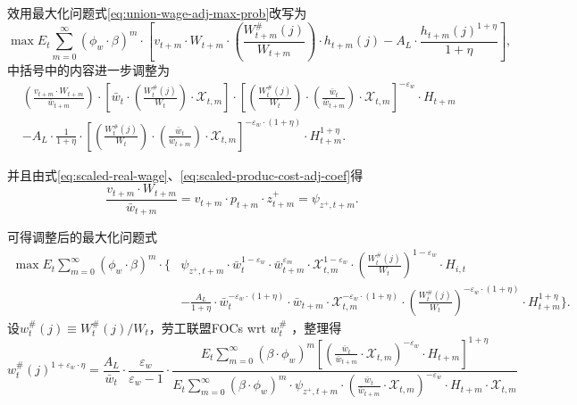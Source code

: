 效用最大化问题式\eqref{eq:union-wage-adj-max-prob}改写为
\begin{equation*}
  \max E_t \sum_{m=0}^{\infty} \left(\phi_w \cdot \beta \right)^{m}  \cdot \left[v_{t+m} \cdot W_{t+m} \cdot \left(\frac{W_{t+m}^{\#}(j)}{W_{t+m}}\right) \cdot h_{t+m}(j) - A_L \cdot \frac{h_{t+m}(j)^{1+\eta}}{1+\eta}\right] ,
\end{equation*}
中括号中的内容进一步调整为
\begin{align*}
&\left(\frac{v_{t+m} \cdot W_{t+m}}{\bar{w}_{t+m}}\right) \cdot \left[\bar{w}_t \cdot \left(\frac{W_t^{\#}(j)}{W_{t}}\right) \cdot \mathcal{X}_{t,m}\right] \cdot \left[ \left(\frac{W_t^{\#}(j)}{W_t}\right) \cdot \left(\frac{\bar{w}_t}{\bar{w}_{t+m}}\right) \cdot \mathcal{X}_{t,m} \right]^{-\varepsilon_w} \cdot H_{t+m} \\
&- A_L \cdot \frac{1}{1+\eta}  \cdot \left[ \left(\frac{W_t^{\#}(j)}{W_t}\right) \cdot \left(\frac{\bar{w}_t}{\bar{w}_{t+m}}\right) \cdot \mathcal{X}_{t,m} \right]^{-\varepsilon_w \cdot (1+\eta)} \cdot H_{t+m}^{1+\eta}.
\end{align*}

并且由式\eqref{eq:scaled-real-wage}、\eqref{eq:scaled-produc-cost-adj-coef}得
\begin{equation*}
  \frac{v_{t+m} \cdot W_{t+m}}{\bar{w}_{t+m}} = v_{t+m} \cdot p_{t+m} \cdot z_{t+m}^+ = \psi_{z^+,t+m}.
\end{equation*}

可得调整后的最大化问题式
\begin{align}
  \label{eq:union-wage-adj-max-prob-2}
    \max E_t \sum_{m=0}^{\infty} \left(\phi_w \cdot \beta \right)^{m}  \cdot \{
      &\psi_{z^+,t+m} \cdot \bar{w}_{t}^{1-\varepsilon_w} \cdot \bar{w}_{t+m}^{\varepsilon_m} \cdot \mathcal{X}_{t,m}^{1-\varepsilon_w} \cdot \left(\frac{W_t^{\#}(j)}{W_t}\right)^{1-\varepsilon_w} \cdot H_{i,t} \nonumber \\
& - \frac{A_L}{1+\eta} \cdot \bar{w}_t^{-\varepsilon_w \cdot (1+\eta)} \cdot \bar{w}_{t+m} \cdot \mathcal{X}_{t,m}^{-\varepsilon_w \cdot (1+\eta)} \cdot \left(\frac{W_t^{\#}(j)}{W_t}\right)^{-\varepsilon_w \cdot (1+\eta)} \cdot H_{t+m}^{1+\eta} \}.
\end{align}
设$w_t^{\#}(j) \equiv W_t^{\#}(j)/W_t$，劳工联盟FOCs wrt $w_t^{\#}$ ，整理得
\begin{equation}
  \label{eq:union-max-prob-FOC-wsharp}
  w_t^{\#}(j)^{1+\varepsilon_w \cdot \eta} = \frac{A_L}{\bar{w}_t} \cdot \frac{\varepsilon_w}{\varepsilon_w -1} \cdot \frac{
  E_t \sum_{m=0}^{\infty} \left(\beta \cdot \phi_w\right)^m  \left[
\left( \frac{\bar{w}_t}{\bar{w}_{t+m}} \cdot \mathcal{X}_{t,m} \right)^{-\varepsilon_w} \cdot H_{t+m} \right]^{1+\eta}
  }
{
  E_t \sum_{m=0}^{\infty} \left(\beta \cdot \phi_w\right)^m  \cdot \psi_{z^+,t+m} \cdot \left( \frac{\bar{w}_t}{\bar{w}_{t+m}} \cdot \mathcal{X}_{t,m} \right)^{-\varepsilon_w} \cdot H_{t+m} \cdot \mathcal{X}_{t,m}
}
\end{equation}

